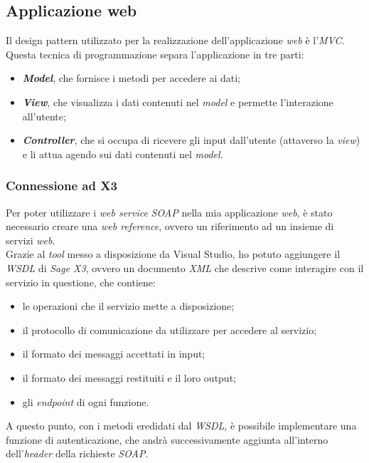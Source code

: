 \subsection{Applicazione web}
Il design pattern utilizzato per la realizzazione dell'applicazione \textit{web} è l'\textit{MVC}.\\
Questa tecnica di programmazione separa l'applicazione in tre parti:
\begin{itemize}
	\item \textbf{\textit{Model}}, che fornisce i metodi per accedere ai dati;
	\item \textbf{\textit{View}}, che visualizza i dati contenuti nel \textit{model} e permette l'interazione all'utente;
	\item \textbf{\textit{Controller}}, che si occupa di ricevere gli input dall'utente (attaverso la \textit{view}) e li attua agendo sui dati contenuti nel \textit{model}.
\end{itemize}

\vspace{15pt}
\subsubsection{Connessione ad X3}
Per poter utilizzare i \textit{web service} \textit{SOAP} nella mia applicazione \textit{web}, è stato necessario creare una \textit{web reference}, ovvero un riferimento ad un insieme di servizi \textit{web}.\\
Grazie al \textit{tool} messo a disposizione da Visual Studio, ho potuto aggiungere il \textit{WSDL} di \textit{Sage X3}, ovvero un documento \textit{XML} che descrive come interagire con il servizio in questione, che contiene:
\begin{itemize}
	\item le operazioni che il servizio mette a disposizione;
	\item il protocollo di comunicazione da utilizzare per accedere al servizio;
	\item il formato dei messaggi accettati in input;
	\item il formato dei messaggi restituiti e il loro output;
	\item gli \textit{endpoint} di ogni funzione.
\end{itemize}
A questo punto, con i metodi eredidati dal \textit{WSDL}, è possibile implementare una funzione di autenticazione, che andrà successivamente aggiunta all'interno dell'\textit{header} della richieste \textit{SOAP}.



